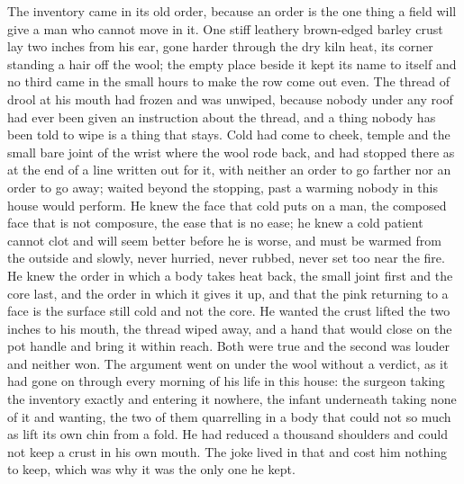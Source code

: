 The inventory came in its old order, because an order is the one thing a field will give a man who cannot move in it. One stiff leathery brown-edged barley crust lay two inches from his ear, gone harder through the dry kiln heat, its corner standing a hair off the wool; the empty place beside it kept its name to itself and no third came in the small hours to make the row come out even. The thread of drool at his mouth had frozen and was unwiped, because nobody under any roof had ever been given an instruction about the thread, and a thing nobody has been told to wipe is a thing that stays. Cold had come to cheek, temple and the small bare joint of the wrist where the wool rode back, and had stopped there as at the end of a line written out for it, with neither an order to go farther nor an order to go away;  waited beyond the stopping, past a warming nobody in this house would perform. He knew the face that cold puts on a man, the composed face that is not composure, the ease that is no ease; he knew a cold patient cannot clot and will seem better before he is worse, and must be warmed from the outside and slowly, never hurried, never rubbed, never set too near the fire. He knew the order in which a body takes heat back, the small joint first and the core last, and the order in which it gives it up, and that the pink returning to a face is the surface still cold and not the core. He wanted the crust lifted the two inches to his mouth, the thread wiped away, and a hand that would close on the pot handle and bring it within reach. Both were true and the second was louder and neither won. The argument went on under the wool without a verdict, as it had gone on through every morning of his life in this house: the surgeon taking the inventory exactly and entering it nowhere, the infant underneath taking none of it and wanting, the two of them quarrelling in a body that could not so much as lift its own chin from a fold. He had reduced a thousand shoulders and could not keep a crust in his own mouth. The joke lived in that and cost him nothing to keep, which was why it was the only one he kept.

